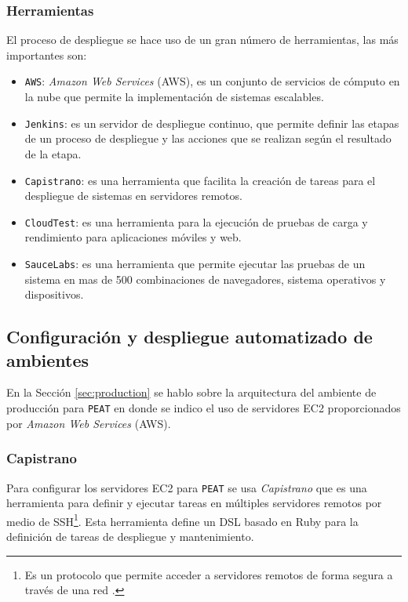 \subsubsection{Herramientas}

El proceso de despliegue se hace uso de un gran número de herramientas, las más
importantes son:

\begin{itemize}
\item \texttt{AWS}: \textit{Amazon Web Services} (AWS), es un conjunto de servicios
  de cómputo en la nube que permite la implementación de sistemas escalables.
\item \texttt{Jenkins}: es un servidor de despliegue continuo, que permite
  definir las etapas de un proceso de despliegue y las acciones que se realizan
  según el resultado de la etapa.
\item \texttt{Capistrano}: es una herramienta que facilita la creación de tareas
  para el despliegue de sistemas en servidores remotos.
\item \texttt{CloudTest}: es una herramienta para la ejecución de pruebas de
  carga y rendimiento para aplicaciones móviles y web.
\item \texttt{SauceLabs}: es una herramienta que permite ejecutar las pruebas de un
  sistema en mas de 500 combinaciones de navegadores, sistema operativos
  y dispositivos.
\end{itemize}

\subsection{Configuración y despliegue automatizado de ambientes}

En la Sección \ref{sec:production} se hablo sobre la arquitectura del ambiente
de producción para \texttt{PEAT} en donde se indico el uso de servidores EC2
proporcionados por \textit{Amazon Web Services} (AWS).

\subsubsection{Capistrano}

Para configurar los servidores EC2 para \texttt{PEAT} se usa \textit{Capistrano}
que es una herramienta para definir y ejecutar tareas en
múltiples servidores remotos por medio de SSH\footnote{Es un protocolo que permite
  acceder a servidores remotos de forma segura a través de una red
  \cite{29_ssh_protocol}.}. Esta herramienta define un DSL basado en Ruby para la
definición de tareas de despliegue y mantenimiento.

